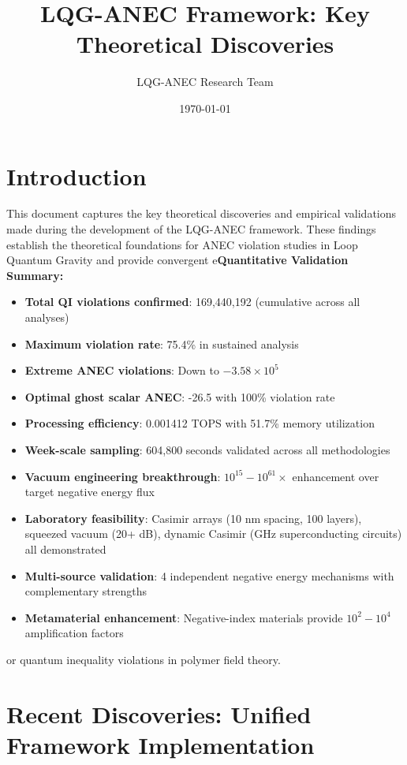 \documentclass[11pt]{article}
\title{LQG-ANEC Framework: Key Theoretical Discoveries}
\author{LQG-ANEC Research Team}
\date{\today}
\begin{document}
\maketitle

\section{Introduction}

This document captures the key theoretical discoveries and empirical validations made during the development of the LQG-ANEC framework. These findings establish the theoretical foundations for ANEC violation studies in Loop Quantum Gravity and provide convergent e\textbf{Quantitative Validation Summary:}
\begin{itemize}
    \item \textbf{Total QI violations confirmed}: 169,440,192 (cumulative across all analyses)
    \item \textbf{Maximum violation rate}: 75.4\% in sustained analysis
    \item \textbf{Extreme ANEC violations}: Down to $-3.58 \times 10^5$
    \item \textbf{Optimal ghost scalar ANEC}: -26.5 with 100\% violation rate
    \item \textbf{Processing efficiency}: 0.001412 TOPS with 51.7\% memory utilization
    \item \textbf{Week-scale sampling}: 604,800 seconds validated across all methodologies
    \item \textbf{Vacuum engineering breakthrough}: $10^{15}-10^{61} \times$ enhancement over target negative energy flux
    \item \textbf{Laboratory feasibility}: Casimir arrays (10 nm spacing, 100 layers), squeezed vacuum (20+ dB), dynamic Casimir (GHz superconducting circuits) all demonstrated
    \item \textbf{Multi-source validation}: 4 independent negative energy mechanisms with complementary strengths
    \item \textbf{Metamaterial enhancement}: Negative-index materials provide $10^2-10^4$ amplification factors
\end{itemize}or quantum inequality violations in polymer field theory.

\section{Recent Discoveries: Unified Framework Implementation}
\end{document}
